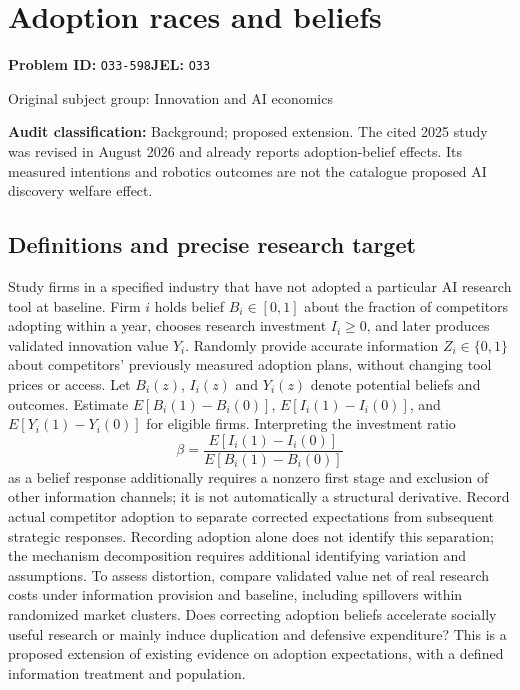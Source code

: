 \documentclass[11pt,a4paper]{article}
\begin{document}
\section*{Adoption races and beliefs}
\textbf{Problem ID:} \texttt{O33-598}\quad \textbf{JEL:} \texttt{O33}\par
\label{problem:OP-0413}
{\sffamily\small\color{muted}Original subject group: Innovation and AI economics\par}
\label{definitions:problem:30007695}
\textbf{Audit classification:} Background; proposed extension. The cited 2025 study was revised in August 2026 and already reports adoption-belief effects. Its measured intentions and robotics outcomes are not the catalogue proposed AI discovery welfare effect.
\subsection*{Definitions and precise research target}
Study firms in a specified industry that have not adopted a particular AI research tool at baseline. Firm \(i\) holds belief \(B_i\in[0,1]\) about the fraction of competitors adopting within a year, chooses research investment \(I_i\geq0\), and later produces validated innovation value \(Y_i\). Randomly provide accurate information \(Z_i\in\{0,1\}\) about competitors' previously measured adoption plans, without changing tool prices or access. Let \(B_i(z)\), \(I_i(z)\) and \(Y_i(z)\) denote potential beliefs and outcomes. Estimate \(E[B_i(1)-B_i(0)]\), \(E[I_i(1)-I_i(0)]\), and \(E[Y_i(1)-Y_i(0)]\) for eligible firms. Interpreting the investment ratio
\[
\beta=\frac{E[I_i(1)-I_i(0)]}{E[B_i(1)-B_i(0)]}
\]
as a belief response additionally requires a nonzero first stage and exclusion of other information channels; it is not automatically a structural derivative. Record actual competitor adoption to separate corrected expectations from subsequent strategic responses. Recording adoption alone does not identify this separation; the mechanism decomposition requires additional identifying variation and assumptions. To assess distortion, compare validated value net of real research costs under information provision and baseline, including spillovers within randomized market clusters. Does correcting adoption beliefs accelerate socially useful research or mainly induce duplication and defensive expenditure? This is a proposed extension of existing evidence on adoption expectations, with a defined information treatment and population.
\end{document}
